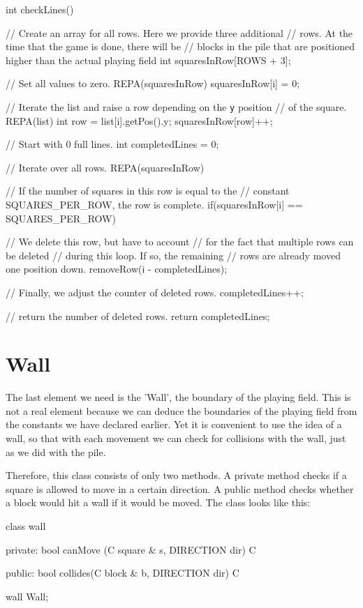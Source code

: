 \begin{code}
int checkLines()
{
	// Create an array for all rows. Here we provide three additional 
	// rows. At the time that the game is done, there will be
	// blocks in the pile that are positioned higher than the actual 
	playing field
	int squaresInRow[ROWS + 3];
	
	// Set all values ​​to zero.
	REPA(squaresInRow) squaresInRow[i] = 0;
	
	// Iterate the list and raise a row depending on the \verb|y| position 
	// of the square.
	REPA(list)
{
		 int row = list[i].getPos().y;
		 squaresInRow[row]++;
}
	
	// Start with 0 full lines.
	int completedLines = 0;
	
	// Iterate over all rows.
	REPA(squaresInRow)
{
		 // If the number of squares in this row is equal to the 
		 // constant SQUARES_PER_ROW, the row is complete.
		 if(squaresInRow[i] == SQUARES_PER_ROW)
 {
				// We delete this row, but have to account
				// for the fact that multiple rows can be deleted
				// during this loop. If so, the remaining
				// rows are already moved one position down.
				removeRow(i - completedLines);
				
				// Finally, we adjust the counter of deleted rows.
				completedLines++;           
 }
}
	
	// return the number of deleted rows.
	return completedLines;
}
\end{code}

\section{Wall}
The last element we need is the 'Wall', the boundary of the playing field. This is not a real element because we can deduce the boundaries of the playing field from the constants we have declared earlier. Yet it is convenient to use the idea of ​​a wall, so that with each movement we can check for collisions with the wall, just as we did with the pile.

Therefore, this class consists of only two methods. A private method  checks if a square is allowed to move in a certain direction. A public method  checks whether a block would hit a wall if it would be moved. The class looks like this:

\begin{code}
class wall
{
private:
   bool canMove (C square & s, DIRECTION dir) C {}
   
public:  
   bool collides(C block  & b, DIRECTION dir) C {}
}

wall Wall;
\end{code}

